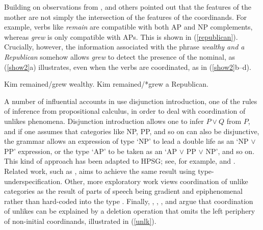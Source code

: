 \noindent
Building on observations from \citet[417]{jacobson}, \citet{Sag:03} and others pointed out that the
features of the mother are not simply the intersection of the features of the coordinands.  For
example, verbs like \emph{remain} are compatible with both AP and NP complements, whereas
\emph{grew} is only compatible with APs.  This is shown in (\ref{republican}).  Crucially,
however, the information associated with the phrase \emph{wealthy and a Republican} somehow allows
\emph{grew} to detect the presence of the nominal, as (\ref{show2}a) illustrates, even when the
verbs are coordinated, as in (\ref{show2}b--d).


\eal
\label{republican}
\ex  Kim remained/grew wealthy.
\ex  Kim remained/*grew a Republican.
\zl



\eal
\label{show2}
\zl


A number of influential accounts in 
\citep{morrill90,morrill94,bayer}
use disjunction introduction, one of the rules of inference from propositional calculus, in order to
deal with coordination of unlikes phenomena. Disjunction introduction allows one to infer $P \vee Q$
from $P$, and if one assumes that categories like NP, PP, and so on can also be disjunctive, the
grammar allows an expression of type `NP' to lead a double life as an `NP $\vee$ PP' expression, or
the type `AP' to be taken as an `AP $\vee$ PP $\vee$ NP', and so on. This kind of approach has been
adapted to HPSG; see, for example, \citet{Daniels02} and \citet{Yatabe:04}.  Related work, such as \citet{Sag:03}, aims to
achieve the same result using type-underspecification. Other, more
exploratory work views coordination of unlike categories as the result of parts of speech being
gradient and epiphenomenal rather than hard-coded into the type 
\citep{Chaves2013b-u}. Finally, \citet{berthold0}, \citet{yatabe}, \citet{Beavers}, and
\citet{chaves06} argue that coordination of unlikes can be explained by a deletion operation that
omits the left periphery of non-initial coordinands, illustrated in (\ref{unlk}).

